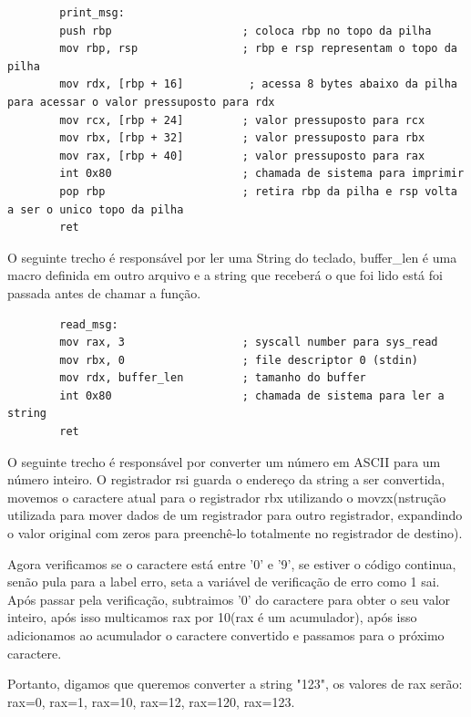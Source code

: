 \documentclass[12pt, openany, oneside, a4paper, brazil]{abntex2}
\begin{document}
	\begin{verbatim}
		print_msg:
		push rbp                    ; coloca rbp no topo da pilha
		mov rbp, rsp                ; rbp e rsp representam o topo da pilha
		mov rdx, [rbp + 16]          ; acessa 8 bytes abaixo da pilha para acessar o valor pressuposto para rdx
		mov rcx, [rbp + 24]         ; valor pressuposto para rcx
		mov rbx, [rbp + 32]         ; valor pressuposto para rbx
		mov rax, [rbp + 40]         ; valor pressuposto para rax
		int 0x80                    ; chamada de sistema para imprimir
		pop rbp                     ; retira rbp da pilha e rsp volta a ser o unico topo da pilha
		ret
	\end{verbatim}
	
	O seguinte trecho é responsável por ler uma String do teclado, buffer\_len é uma macro definida em outro arquivo e a string que receberá o que foi lido está foi passada antes de chamar a função. 
	
	\begin{verbatim}
		read_msg:
		mov rax, 3                  ; syscall number para sys_read
		mov rbx, 0                  ; file descriptor 0 (stdin)
		mov rdx, buffer_len         ; tamanho do buffer
		int 0x80                    ; chamada de sistema para ler a string
		ret
	\end{verbatim}
	
	O seguinte trecho é responsável por converter um número em ASCII para um número inteiro. O registrador rsi guarda o endereço da string a ser convertida, movemos o caractere atual para o registrador rbx utilizando o movzx(nstrução utilizada para mover dados de um registrador para outro registrador, expandindo o valor original com zeros para preenchê-lo totalmente no registrador de destino).
	
	\noindent Agora verificamos se o caractere está entre '0' e '9', se estiver o código continua, senão pula para a label erro, seta a variável de verificação de erro como 1 sai.
	Após passar pela verificação, subtraimos '0' do caractere para obter o seu valor inteiro, após isso multicamos rax por 10(rax é um acumulador), após isso adicionamos ao acumulador o caractere convertido e passamos para o próximo caractere.
	
	\noindent Portanto, digamos que queremos converter a string "123", os valores de rax serão: rax=0, rax=1, rax=10, rax=12, rax=120, rax=123.
	
\end{document}
